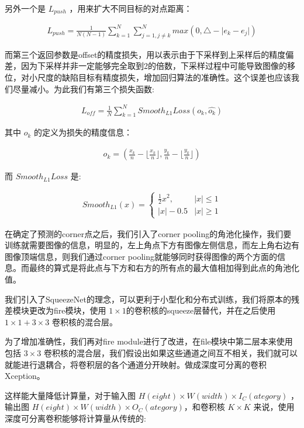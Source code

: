 另外一个是 $ L_{push} $ ，用来扩大不同目标的对点距离：

\begin{eqnarray}
    L_{push} = \frac{1}{N(N-1)}\sum^{N}_{k=1}\sum^{N}_{j=1,j\neq k} max(0,\triangle-\lvert e_k -e_j \rvert)
\end{eqnarray}


而第三个返回参数是offset的精度损失，用以表示由于下采样到上采样后的精度偏差，因为下采样并非一定能够完全取到2的倍数，下采样过程中可能导致图像的移位，对小尺度的缺陷目标有精度损失，增加回归算法的准确性。这个误差也应该我们尽量减小。为此我们有第三个损失函数:

\begin{eqnarray}
    L_{off} = \frac{1}{N}\sum^{N}_{k=1}Smooth_{L1}Loss(o_k,\hat{o_k})
\end{eqnarray}

其中 $ o_k $ 的定义为损失的精度信息：

\begin{eqnarray}
    o_k = (\frac{x_k}{n}-\lfloor\frac{x_k}{n}\rfloor,\frac{y_k}{n}-\lfloor\frac{y_k}{n}\rfloor)
\end{eqnarray}

而 $ Smooth_{L1}Loss $ 是:

\begin{eqnarray}
    Smooth_{L1}(x) = 
    \left\{  
        \begin{array}{lr}  
        \frac{1}{2}x^2, & \lvert x \rvert \le 1\\  
        \lvert x \rvert - 0.5 & \lvert x \rvert \geq 1    
        \end{array}  
\right.  
\end{eqnarray}

在确定了预测的corner点之后，我们引入了corner pooling的角池化操作，我们要训练就需要图像的信息，明显的，左上角点下方有图像左侧信息，而左上角右边有图像顶端信息，则我们通过corner pooling就能够同时获得图像的两个方面的信息。而最终的算式是将此点与下方和右方的所有点的最大值相加得到此点的角池化值。

我们引入了SqueezeNet的理念，可以更利于小型化和分布式训练，我们将原本的残差模块更改为fire模块，使用 $ 1 \times 1$的卷积核的squeeze层替代，并在之后使用 $ 1 \times 1 + 3\times 3 $ 卷积核的混合层。

为了增加准确性，我们再对fire module进行了改进，在file模块中第二层本来使用包括 $ 3 \times 3 $ 卷积核的混合层，我们假设出如果这些通道之间互不相关，我们就可以就能进行退耦合，将卷积层的各个通道分开映射。做成深度可分离的卷积Xception。

这样能大量降低计算量，对于输入图 $ H(eight) \times W(width) \times I_C(ategory) $ ，输出图 $ H(eight) \times W(width) \times O_C(ategory) $，和卷积核 $ K \times K $ 来说，使用深度可分离卷积能够将计算量从传统的:

